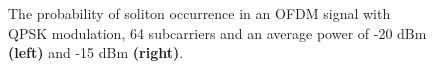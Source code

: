 \begin{figure}[htpb]
    \begin{minipage}[h]{0.49\linewidth}
    \end{minipage}
    \hfill
    \begin{minipage}[h]{0.49\linewidth}
    \end{minipage}
    \caption{The probability of soliton occurrence in an OFDM signal with QPSK modulation, 64 subcarriers and an average power of -20 dBm \textbf{(left)} and -15 dBm \textbf{(right)}.}
    \label{fig:ds_stat}
\end{figure}

